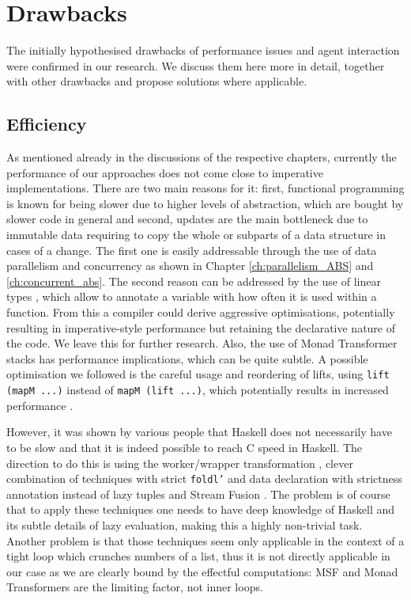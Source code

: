 \section{Drawbacks}
\label{sec:drawbacks}
The initially hypothesised drawbacks of performance issues and agent interaction were confirmed in our research. We discuss them here more in detail, together with other drawbacks and propose solutions where applicable.

\subsection{Efficiency}
\label{sec:drawback_efficiency}
As mentioned already in the discussions of the respective chapters, currently the performance of our approaches does not come close to imperative implementations. There are two main reasons for it: first, functional programming is known for being slower due to higher levels of abstraction, which are bought by slower code in general and second, updates are the main bottleneck due to immutable data requiring to copy the whole or subparts of a data structure in cases of a change. The first one is easily addressable through the use of data parallelism and concurrency as shown in Chapter \ref{ch:parallelism_ABS} and \ref{ch:concurrent_abs}. The second reason can be addressed by the use of linear types \cite{bernardy_linear_2017}, which allow to annotate a variable with how often it is used within a function. From this a compiler could derive aggressive optimisations, potentially resulting in imperative-style performance but retaining the declarative nature of the code. We leave this for further research. Also, the use of Monad Transformer stacks has performance implications, which can be quite subtle. A possible optimisation we followed is the careful usage and reordering of lifts, using \texttt{lift (mapM ...)} instead of \texttt{mapM (lift ...)}, which potentially results in increased performance .

However, it was shown by various people \cite{kqr_competing_2017, stewart_haskell_2008, stolarek_haskell_2013} that Haskell does not necessarily have to be slow and that it is indeed possible to reach C speed in Haskell. The direction to do this is using the worker/wrapper transformation \cite{gill_worker/wrapper_2009}, clever combination of techniques with strict \texttt{foldl'} and data declaration with strictness annotation instead of lazy tuples and Stream Fusion \cite{coutts_stream_2007, mainland_haskell_2013}. The problem is of course that to apply these techniques one needs to have deep knowledge of Haskell and its subtle details of lazy evaluation, making this a highly non-trivial task. Another problem is that those techniques seem only applicable in the context of a tight loop which crunches numbers of a list, thus it is not directly applicable in our case as we are clearly bound by the effectful computations: MSF and Monad Transformers are the limiting factor, not inner loops.

